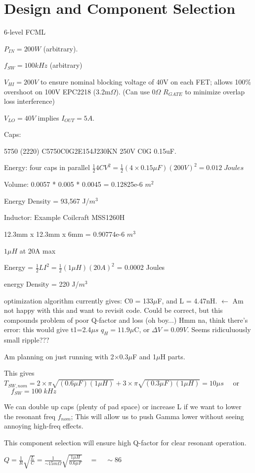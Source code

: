 


\newpage

\section*{Design and Component Selection}
6-level FCML 

$P_{IN}=200W$ (arbitrary).

$f_{SW}=100kHz$ (arbitrary)

$V_{HI} = 200V$ to ensure nominal blocking voltage of 40V on each FET; allows 100\% overshoot on 100V EPC2218 (3.2m$\Omega$). (Can use 0$\Omega$ $R_{GATE}$ to minimize overlap loss interference)

$V_{LO}=40V$ implies $I_{OUT}=5A$.

\vspace{1em}
Caps:

5750 (2220) C5750C0G2E154J230KN 250V  C0G 0.15uF. 

Energy: four caps in parallel $\frac{1}{2}4CV^2 = \frac{1}{2}(4\times 0.15\mu F)(200V)^2 = 0.012 \; Joules$

Volume: 0.0057 * 0.005 * 0.0045 = 0.12825e-6 $m^2$

Energy Density = 93,567 J/$m^3$

\vspace{2em}
Inductor: Example Coilcraft MSS1260H

12.3mm x 12.3mm x 6mm = 0.90774e-6 $m^3$

$1\mu H$ at 20A max

Energy = $\frac{1}{2} L I^2 = \frac{1}{2} (1\mu H) (20A)^2$ = 0.0002 Joules

energy Density = 220 J/$m^3$

optimization algorithm currently gives: C0 = 133$\mu$F, and L = 4.47nH.  $\longleftarrow$ Am not happy with this and want to revisit code. Could be correct, but this compounds problem of poor Q-factor and loss (oh boy...) Hmm na, think there's error: this would give t1=2.4$\mu s$ $q_H=11.9\mu$C, or $\Delta V=0.09V$. Seems ridiculuously small ripple???

\vspace{1em}
Am planning on just running with 2$\times$0.3$\mu$F and 1$\mu$H parts. 

This gives $T_{SW,nom} = 2 \times \pi \sqrt{(0.6\mu F)(1\mu H)} + 3 \times  \pi \sqrt{(0.3\mu F)(1\mu H)} = 10\mu s \quad$ or $\quad f_{SW}= 100\;kHz$

We can double up caps (plenty of pad space) or increase L if we want to lower the resonant freq $f_{nom}$; This will allow us to push Gamma lower without seeing annoying high-freq effects.

This component selection will ensure high Q-factor for clear resonant operation.

$Q = \frac{1}{R}\sqrt{\frac{L}{C}} = \frac{1}{\sim 15m\Omega}\sqrt{\frac{1\mu H}{0.6\mu F}} \quad = \quad \sim 86 $





